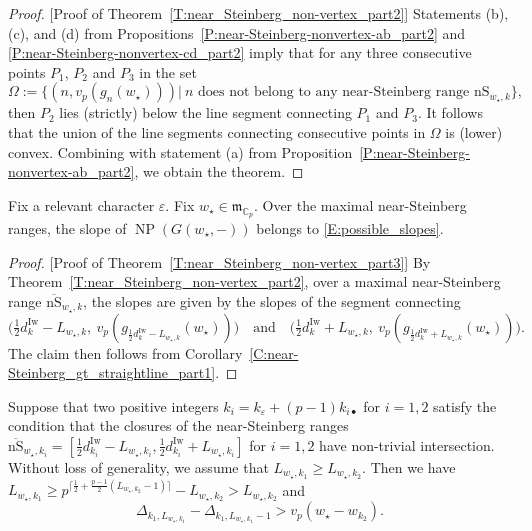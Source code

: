 \begin{proof}
    [Proof of Theorem~\ref{T:near_Steinberg_non-vertex_part2}]
    Statements (b), (c), and (d) from Propositions~\ref{P:near-Steinberg-nonvertex-ab_part2} and \ref{P:near-Steinberg-nonvertex-cd_part2} imply that for any three consecutive points $P_1$, $P_2$ and $P_3$ in the set
    \[
    \Omega:= \{(n,v_p(g_n(w_\star)))| ~n \text{~does not belong to any near-Steinberg range~} {\mathrm{nS}}_{w_\star,k} \},
    \]
    then $P_2$ lies (strictly) below the line segment connecting $P_1$ and $P_3$. It follows that the union of the line segments connecting consecutive points in $\Omega$ is (lower) convex. Combining with statement (a) from Proposition~\ref{P:near-Steinberg-nonvertex-ab_part2}, we obtain the theorem.
\end{proof}

\begin{theorem}
    \label{T:near_Steinberg_non-vertex_part3}
    Fix a relevant character $\varepsilon$.
    Fix $w_\star \in {\mathfrak{m}}_{{\mathbb{C}}_p}$.
    Over the maximal near-Steinberg ranges, the slope of ${\operatorname{NP}}(G(w_\star, -))$ belongs to \eqref{E:possible_slopes}.
\end{theorem}

\begin{proof}
    [Proof of Theorem~\ref{T:near_Steinberg_non-vertex_part3}]
    By Theorem~\ref{T:near_Steinberg_non-vertex_part2}, over a maximal near-Steinberg range $\overline{\mathrm{nS}}_{w_\star, k}$, the slopes are given by the slopes of the segment connecting
    $$
    \big( \tfrac 12d_{k}^{\mathrm{Iw}}- L_{w_\star, k},\ v_p(g_{\frac 12d_{k}^{\mathrm{Iw}}- L_{w_\star, k}}(w_\star)) \big) \quad \textrm{and} \quad \big( \tfrac 12d_{k}^{\mathrm{Iw}}+ L_{w_\star, k},\ v_p( g_{\frac 12d_{k}^{\mathrm{Iw}}+ L_{w_\star, k}}(w_\star)) \big).
    $$
    The claim then follows from Corollary~\ref{C:near-Steinberg_gt_straightline_part1}.
\end{proof}

\begin{lemma}
    \label{L:comparison_of_two_near-Steinberg_ranges_with_a_nonempty_intersection}
    Suppose that two positive integers $k_i = k_\varepsilon + (p-1)k_{i\bullet}$ for $i=1,2$ satisfy the condition that the closures of the near-Steinberg ranges $\overline {\mathrm{nS}}_{w_\star, k_i}=[\frac 12 d_{k_i}^{\mathrm{Iw}}-L_{w_\star,k_i},\frac 12 d_{k_i}^{\mathrm{Iw}}+L_{w_\star,k_i}]$ for $i=1,2$ have non-trivial intersection. Without loss of generality, we assume that $L_{w_\star, k_1} \geq L_{w_\star, k_2}$. Then we have $L_{w_\star, k_1}  \geq p^{\lceil\frac 12 + \frac{p-1}2(L_{w_\star, k_2}-1) \rceil} - L_{w_\star, k_2} > L_{w_\star, k_2}$ and
    	\begin{equation}
    	\label{E:Delta_k1_gt_Delta_k2}
    	\Delta_{k_1, L_{w_\star, k_1}}
    	- \Delta_{k_1, L_{w_\star, k_1}-1}>v_p(w_\star - w_{k_2}).
    	\end{equation}
\end{lemma}

